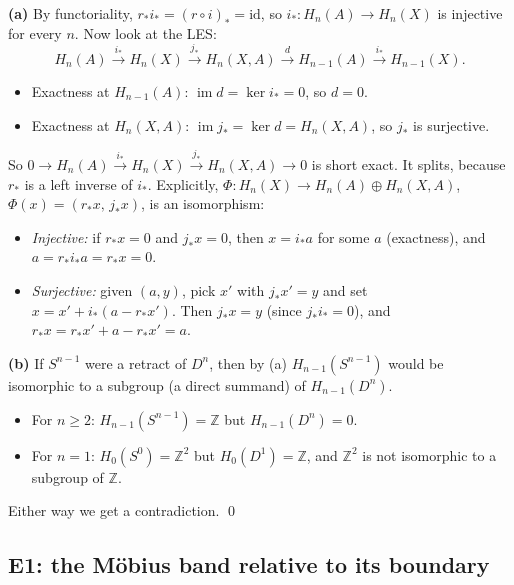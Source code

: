 \documentclass[11pt]{article}
\newcommand{\Z}{\mathbb Z}
\newcommand{\im}{\operatorname{im}}
\begin{document}
\textbf{(a)} By functoriality, $r_*i_*=(r\circ i)_*=\mathrm{id}$, so $i_*:H_n(A)\to H_n(X)$ is injective for every $n$. Now look at the LES:
\[H_n(A)\xrightarrow{i_*}H_n(X)\xrightarrow{j_*}H_n(X,A)\xrightarrow{d}H_{n-1}(A)\xrightarrow{i_*}H_{n-1}(X).\]
\begin{itemize}
\item Exactness at $H_{n-1}(A)$: $\im d=\ker i_*=0$, so $d=0$.
\item Exactness at $H_n(X,A)$: $\im j_*=\ker d=H_n(X,A)$, so $j_*$ is surjective.
\end{itemize}
So $0\to H_n(A)\xrightarrow{i_*}H_n(X)\xrightarrow{j_*}H_n(X,A)\to0$ is short exact. It splits, because $r_*$ is a left inverse of $i_*$. Explicitly, $\Phi:H_n(X)\to H_n(A)\oplus H_n(X,A)$, $\Phi(x)=(r_*x,\,j_*x)$, is an isomorphism:
\begin{itemize}
\item \emph{Injective:} if $r_*x=0$ and $j_*x=0$, then $x=i_*a$ for some $a$ (exactness), and $a=r_*i_*a=r_*x=0$.
\item \emph{Surjective:} given $(a,y)$, pick $x'$ with $j_*x'=y$ and set $x=x'+i_*(a-r_*x')$. Then $j_*x=y$ (since $j_*i_*=0$), and $r_*x=r_*x'+a-r_*x'=a$.
\end{itemize}

\textbf{(b)} If $S^{n-1}$ were a retract of $D^n$, then by (a) $H_{n-1}(S^{n-1})$ would be isomorphic to a subgroup (a direct summand) of $H_{n-1}(D^n)$.
\begin{itemize}
\item For $n\ge2$: $H_{n-1}(S^{n-1})=\Z$ but $H_{n-1}(D^n)=0$.
\item For $n=1$: $H_0(S^0)=\Z^2$ but $H_0(D^1)=\Z$, and $\Z^2$ is not isomorphic to a subgroup of $\Z$.
\end{itemize}
Either way we get a contradiction. \qed

\subsection*{E1: the Möbius band relative to its boundary}
\end{document}
